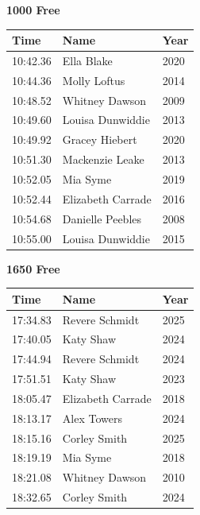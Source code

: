 \vspace{1.2em}
\noindent\begin{minipage}[t]{0.48\textwidth}
\centering
\textbf{\textcolor{teamprimary}{1000 Free}}\par
\vspace{0.5em}
\centering
\small
\renewcommand{\arraystretch}{1.0}
\setlength{\tabcolsep}{4pt}
\begin{tabular}{@{}p{1.8cm}p{3.0cm}p{1.0cm}@{}}
\toprule
\textbf{Time} & \textbf{Name} & \textbf{Year} \\
\midrule
10:42.36 & Ella Blake & 2020 \\
10:44.36 & Molly Loftus & 2014 \\
10:48.52 & Whitney Dawson & 2009 \\
10:49.60 & Louisa Dunwiddie & 2013 \\
10:49.92 & Gracey Hiebert & 2020 \\
10:51.30 & Mackenzie Leake & 2013 \\
10:52.05 & Mia Syme & 2019 \\
10:52.44 & Elizabeth Carrade & 2016 \\
10:54.68 & Danielle Peebles & 2008 \\
10:55.00 & Louisa Dunwiddie & 2015 \\
\bottomrule
\end{tabular}
\end{minipage}
\hfill
\begin{minipage}[t]{0.48\textwidth}
\centering
\textbf{\textcolor{teamprimary}{1650 Free}}\par
\vspace{0.5em}
\centering
\small
\renewcommand{\arraystretch}{1.0}
\setlength{\tabcolsep}{4pt}
\begin{tabular}{@{}p{1.8cm}p{3.0cm}p{1.0cm}@{}}
\toprule
\textbf{Time} & \textbf{Name} & \textbf{Year} \\
\midrule
17:34.83 & Revere Schmidt & 2025 \\
17:40.05 & Katy Shaw & 2024 \\
17:44.94 & Revere Schmidt & 2024 \\
17:51.51 & Katy Shaw & 2023 \\
18:05.47 & Elizabeth Carrade & 2018 \\
18:13.17 & Alex Towers & 2024 \\
18:15.16 & Corley Smith & 2025 \\
18:19.19 & Mia Syme & 2018 \\
18:21.08 & Whitney Dawson & 2010 \\
18:32.65 & Corley Smith & 2024 \\
\bottomrule
\end{tabular}
\end{minipage}
